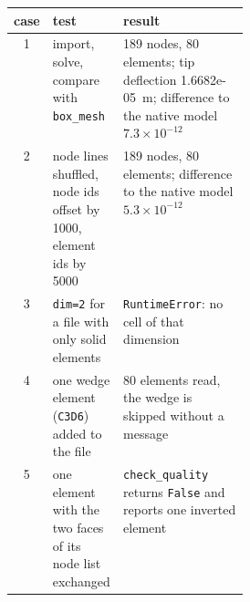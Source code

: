 \begin{tabularx}{\linewidth}{@{}c >{\raggedright\arraybackslash}p{0.3\linewidth} X@{}}
\toprule
case & test & result \\
\midrule
1 & import, solve, compare with \texttt{box\_mesh} & 189 nodes, 80 elements; tip deflection 1.6682e-05~m; difference to the native model $7.3\times10^{-12}$ \\
2 & node lines shuffled, node ids offset by 1000, element ids by 5000 & 189 nodes, 80 elements; difference to the native model $5.3\times10^{-12}$ \\
3 & \texttt{dim=2} for a file with only solid elements & \texttt{RuntimeError}: no cell of that dimension \\
4 & one wedge element (\texttt{C3D6}) added to the file & 80 elements read, the wedge is skipped without a message \\
5 & one element with the two faces of its node list exchanged & \texttt{check\_quality} returns \texttt{False} and reports one inverted element \\
\bottomrule
\end{tabularx}
